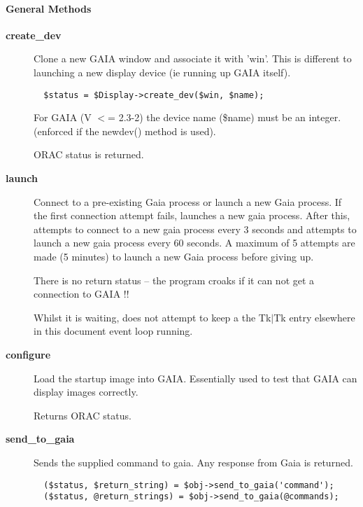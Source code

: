 \paragraph*{General Methods\label{ORAC::Display::GAIA_General_Methods}}\begin{description}
\item[\textbf{create\_dev}] \mbox{}

Clone a new GAIA window and associate it with 'win'. This is different
to launching a new display device (ie running up GAIA itself).

\begin{verbatim}
  $status = $Display->create_dev($win, $name);
\end{verbatim}


For GAIA (V $<$= 2.3-2) the device name (\$name) must be an integer.
(enforced if the newdev() method is used).



ORAC status is returned.

\item[\textbf{launch}] \mbox{}

Connect to a pre-existing Gaia process or launch a new Gaia process.
If the first connection attempt fails, launches a new gaia process.
After this, attempts to connect to a new gaia process every 3 seconds
and attempts to launch a new gaia process every 60 seconds.
A maximum of 5 attempts are made (5 minutes) to launch a new Gaia
process before giving up.



There is no return status -- the program croaks if it can not
get a connection to GAIA !!



Whilst it is waiting, does not attempt to keep a the \textsf{Tk$|$Tk}
 entry elsewhere in this document event loop
running.

\item[\textbf{configure}] \mbox{}

Load the startup image into GAIA. Essentially used to test that
GAIA can display images correctly.



Returns ORAC status.

\item[\textbf{send\_to\_gaia}] \mbox{}

Sends the supplied command to gaia. Any response from Gaia is returned.

\begin{verbatim}
  ($status, $return_string) = $obj->send_to_gaia('command');
  ($status, @return_strings) = $obj->send_to_gaia(@commands);
\end{verbatim}



\end{description}

